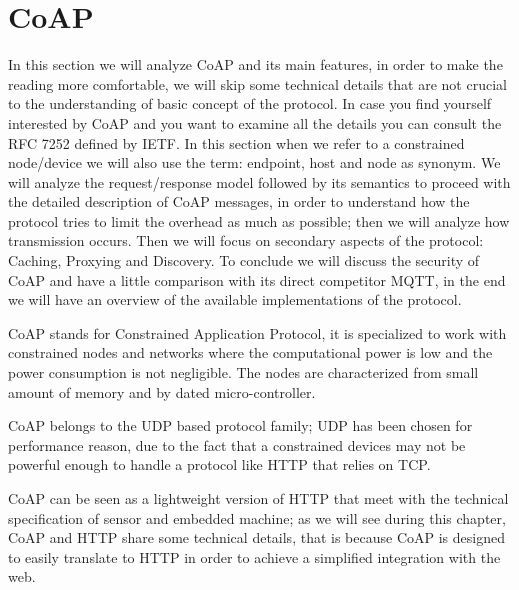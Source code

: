 
	\section{CoAP}
	In this section we will analyze CoAP and its main features, in order to make the reading more comfortable,
	we will skip some technical details that are not crucial to the understanding of basic concept of the protocol.\newline
	In case you find yourself interested by CoAP and you want to examine all the details you can consult
	the RFC 7252 defined by IETF. \newline
	In this section when we refer to a constrained node/device we will also use the term: endpoint, host and node as synonym.\newline
	We will analyze the request/response model followed by its semantics to proceed with the detailed description of CoAP messages, in order to understand how the protocol tries to limit the overhead as much as possible; then we will analyze how transmission occurs.\newline
	Then we will focus on secondary aspects of the protocol: Caching, Proxying and Discovery.\newline
	To conclude we will discuss the security of CoAP and have a little comparison with its direct competitor MQTT, in the end we will have an overview of the available implementations of the protocol.\newline
	
	CoAP stands for Constrained Application Protocol, it is specialized to work with constrained nodes and networks where the computational power is low and the power consumption is not negligible.\newline
	The nodes are characterized from small amount of memory and by dated micro-controller.\newline

	CoAP belongs to the UDP based protocol family; UDP has been chosen for performance reason, due to the fact that a constrained devices may not be powerful enough to handle a protocol like HTTP that relies on TCP.\newline
	
	CoAP can be seen as a lightweight version of HTTP that meet with the technical specification of sensor and embedded machine; as we will see during this chapter, CoAP and HTTP share some technical details, that is because CoAP is designed to easily translate to HTTP in order to achieve a simplified integration with the web.\newline

